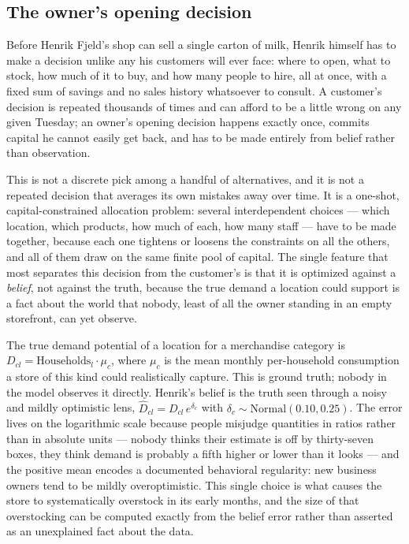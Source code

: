 \documentclass[12pt,a4paper]{article}
\begin{document}
\subsection{The owner's opening decision}
\label{sec:micro-opening}

Before Henrik Fjeld's shop can sell a single carton of milk, Henrik
himself has to make a decision unlike any his customers will ever face:
where to open, what to stock, how much of it to buy, and how many people
to hire, all at once, with a fixed sum of savings and no sales history
whatsoever to consult. A customer's decision is repeated thousands of
times and can afford to be a little wrong on any given Tuesday; an
owner's opening decision happens exactly once, commits capital he cannot
easily get back, and has to be made entirely from belief rather than
observation.

This is not a discrete pick among a handful of alternatives, and it is
not a repeated decision that averages its own mistakes away over time.
It is a one-shot, capital-constrained allocation problem: several
interdependent choices --- which location, which products, how much of
each, how many staff --- have to be made together, because each one
tightens or loosens the constraints on all the others, and all of them
draw on the same finite pool of capital. The single feature that most
separates this decision from the customer's is that it is optimized
against a \emph{belief}, not against the truth, because the true demand a
location could support is a fact about the world that nobody, least of
all the owner standing in an empty storefront, can yet observe.

The true demand potential of a location for a merchandise category is
$D_{cl} = \text{Households}_l \cdot \mu_c$, where $\mu_c$ is the mean
monthly per-household consumption a store of this kind could realistically
capture. This is ground truth; nobody in the model observes it directly.
Henrik's belief is the truth seen through a noisy and mildly optimistic
lens, $\hat{D}_{cl} = D_{cl}\,e^{\delta_c}$ with $\delta_c \sim
\text{Normal}(0.10, 0.25)$. The error lives on the logarithmic scale
because people misjudge quantities in ratios rather than in absolute
units --- nobody thinks their estimate is off by thirty-seven boxes,
they think demand is probably a fifth higher or lower than it looks ---
and the positive mean encodes a documented behavioral regularity: new
business owners tend to be mildly overoptimistic. This single choice is
what causes the store to systematically overstock in its early months,
and the size of that overstocking can be computed exactly from the
belief error rather than asserted as an unexplained fact about the data.
\end{document}
